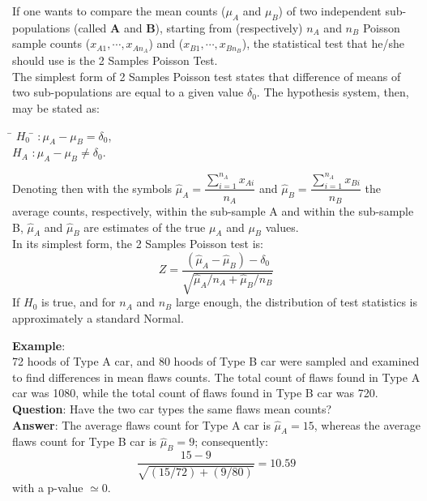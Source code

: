 
\begin{frame}
  \vspace{.5cm}
  If one wants to compare the mean counts ($\mu_A $ and $\mu_B $) of two independent sub-populations (called \textbf{A} and \textbf{B}), starting from (respectively) $n_A$ and $n_B$ Poisson sample counts ($x_{A1}, \cdots, x_{An_A}$) and ($x_{B1}, \cdots, x_{Bn_B}$), the statistical test that he/she should use is the 2 Samples Poisson Test.\\
  \vspace{.25cm}
  The simplest form of 2 Samples Poisson test states that difference of means of two sub-populations are equal to a given value $\delta_0$. The hypothesis system, then, may be stated as:
  \begin{tabbing}
    \=  $ H_0 $ \= $ :  \mu_A - \mu_B =\delta_0$,\\
    \>  $ H_A $ \> $ :  \mu_A - \mu_B \neq \delta_0$.\\
  \end{tabbing}
\end{frame}

\begin{frame}
  \vspace{.25cm}
  Denoting then with the symbols $\hat\mu_A=\dfrac{\sum_{i=1}^{n_A} x_{Ai}}{n_A}$ and $\hat\mu_B=\dfrac{\sum_{i=1}^{n_A} x_{Bi}}{n_B}$ the average counts, respectively, within the sub-sample A and within the sub-sample B, $\hat\mu_A$ and $\hat\mu_B$ are estimates of the true $\mu_A$ and $\mu_B$ values.\\ 
  \vspace{.75cm}
  In its simplest form, the 2 Samples Poisson test is:
  $$ Z=\frac{(\hat{\mu}_A - \hat{\mu}_B)-\delta_0}{\sqrt{\hat{\mu}_A / n_A + \hat{\mu}_B / n_B}} $$
  If $ H_0 $ is true, and for $ n_A $ and $ n_B $ large enough, the distribution of test statistics is approximately a standard Normal.
\end{frame}

\begin{frame}
  \vspace{0.25cm}
  \textbf{Example}:\\
  72 hoods of Type A car, and 80 hoods of Type B car were sampled and examined to find differences in mean flaws counts. The total count of flaws found in Type A car was 1080, while the total count of flaws found in Type B car was 720.\\
  \vspace{0.25cm}
  \textbf{Question}: Have the two car types the same flaws mean counts?\\
  \vspace{0.25cm}
  \textbf{Answer}:
  The average flaws count for Type A car is $\hat\mu_A=15$, whereas the average flaws count for Type B car is $\hat\mu_B=9$; consequently:
  $$ \frac{15-9}{\sqrt{(15/72) + (9/80)}} = 10.59 $$
  with a p-value $\simeq0$.
\end{frame}

